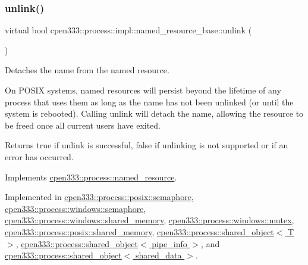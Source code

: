 \subsubsection{\texorpdfstring{unlink()}{unlink()}\hspace{0.1cm}{\footnotesize\ttfamily [1/2]}}
{\footnotesize\ttfamily virtual bool cpen333\+::process\+::impl\+::named\+\_\+resource\+\_\+base\+::unlink (\begin{DoxyParamCaption}{ }\end{DoxyParamCaption})\hspace{0.3cm}{\ttfamily [pure virtual]}}



Detaches the name from the named resource. 

On P\+O\+S\+IX systems, named resources will persist beyond the lifetime of any process that uses them as long as the name has not been unlinked (or until the system is rebooted). Calling {\ttfamily unlink} will detach the name, allowing the resource to be freed once all current users have exited.

\begin{DoxyReturn}{Returns}
{\ttfamily true} if unlink is successful, {\ttfamily false} if unlinking is not supported or if an error has occurred. 
\end{DoxyReturn}


Implements \hyperlink{classcpen333_1_1process_1_1named__resource_a5d33168fee48c9b0c58ab8fd96e230ce}{cpen333\+::process\+::named\+\_\+resource}.



Implemented in \hyperlink{classcpen333_1_1process_1_1posix_1_1semaphore_aa6064e2c4b4b7282cc5e6eda877ee1bb}{cpen333\+::process\+::posix\+::semaphore}, \hyperlink{classcpen333_1_1process_1_1windows_1_1semaphore_abc5159f32e61024c6c6a978ac64fe39d}{cpen333\+::process\+::windows\+::semaphore}, \hyperlink{classcpen333_1_1process_1_1windows_1_1shared__memory_aa6efdc9a3e1310ea69ecc48aeb41286c}{cpen333\+::process\+::windows\+::shared\+\_\+memory}, \hyperlink{classcpen333_1_1process_1_1windows_1_1mutex_aa45381a0a226fbefc86eef8971a5431b}{cpen333\+::process\+::windows\+::mutex}, \hyperlink{classcpen333_1_1process_1_1posix_1_1shared__memory_a3b6d67a41cfaca3712d87958682d8bbe}{cpen333\+::process\+::posix\+::shared\+\_\+memory}, \hyperlink{classcpen333_1_1process_1_1shared__object_aa5b43829da5bd2376927e6285745211c}{cpen333\+::process\+::shared\+\_\+object$<$ T $>$}, \hyperlink{classcpen333_1_1process_1_1shared__object_aa5b43829da5bd2376927e6285745211c}{cpen333\+::process\+::shared\+\_\+object$<$ pipe\+\_\+info $>$}, and \hyperlink{classcpen333_1_1process_1_1shared__object_aa5b43829da5bd2376927e6285745211c}{cpen333\+::process\+::shared\+\_\+object$<$ shared\+\_\+data $>$}.

